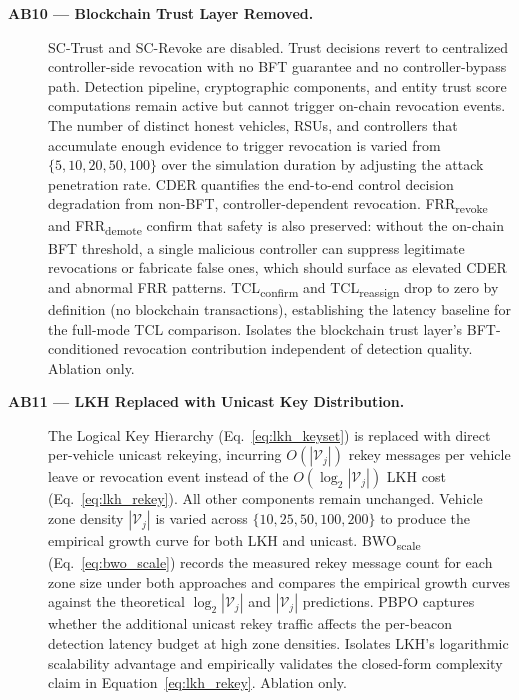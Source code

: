 \documentclass[12pt, a4paper]{report}
\begin{document}
\begin{description}
\item[\textbf{AB10 --- Blockchain Trust Layer Removed.}]
SC-Trust and SC-Revoke are disabled. Trust decisions revert to
centralized controller-side revocation with no BFT guarantee and
no controller-bypass path. Detection pipeline, cryptographic
components, and entity trust score computations remain active but
cannot trigger on-chain revocation events. The number of distinct
honest vehicles, RSUs, and controllers that accumulate enough
evidence to trigger revocation is varied from $\{5, 10, 20, 50,
100\}$ over the simulation duration by adjusting the attack
penetration rate. CDER quantifies the end-to-end control decision
degradation from non-BFT, controller-dependent revocation.
FRR\textsubscript{revoke} and FRR\textsubscript{demote} confirm
that safety is also preserved: without the on-chain BFT threshold,
a single malicious controller can suppress legitimate revocations
or fabricate false ones, which should surface as elevated CDER and
abnormal FRR patterns. TCL\textsubscript{confirm} and
TCL\textsubscript{reassign} drop to zero by definition (no
blockchain transactions), establishing the latency baseline for
the full-mode TCL comparison. Isolates the blockchain trust
layer's BFT-conditioned revocation contribution independent of
detection quality. Ablation only.

\item[\textbf{AB11 --- LKH Replaced with Unicast Key Distribution.}]
The Logical Key Hierarchy (Eq.~\ref{eq:lkh_keyset}) is replaced
with direct per-vehicle unicast rekeying, incurring $O(|\mathcal{V}_j|)$
rekey messages per vehicle leave or revocation event instead of
the $O(\log_2|\mathcal{V}_j|)$ LKH cost (Eq.~\ref{eq:lkh_rekey}).
All other components remain unchanged. Vehicle zone density
$|\mathcal{V}_j|$ is varied across $\{10, 25, 50, 100, 200\}$ to
produce the empirical growth curve for both LKH and unicast.
BWO\textsubscript{scale} (Eq.~\ref{eq:bwo_scale}) records the
measured rekey message count for each zone size under both
approaches and compares the empirical growth curves against the
theoretical $\log_2|\mathcal{V}_j|$ and $|\mathcal{V}_j|$
predictions. PBPO captures whether the additional unicast rekey
traffic affects the per-beacon detection latency budget at high
zone densities. Isolates LKH's logarithmic scalability advantage
and empirically validates the closed-form complexity claim in
Equation~\ref{eq:lkh_rekey}. Ablation only.

\end{description}
\end{document}
